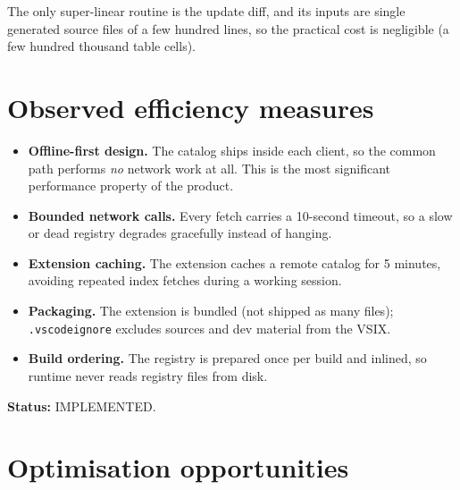 The only super-linear routine is the update diff, and its inputs are single
generated source files of a few hundred lines, so the practical cost is
negligible (a few hundred thousand table cells).

\section{Observed efficiency measures}

\begin{itemize}
  \item \textbf{Offline-first design.} The catalog ships inside each client, so
        the common path performs \emph{no} network work at all. This is the most
        significant performance property of the product.
  \item \textbf{Bounded network calls.} Every fetch carries a 10-second timeout,
        so a slow or dead registry degrades gracefully instead of hanging.
  \item \textbf{Extension caching.} The extension caches a remote catalog for
        5 minutes, avoiding repeated index fetches during a working session.
  \item \textbf{Packaging.} The extension is bundled (not shipped as many files);
        \texttt{.vscodeignore} excludes sources and dev material from the VSIX.
  \item \textbf{Build ordering.} The registry is prepared once per build and
        inlined, so runtime never reads registry files from disk.
\end{itemize}

\textbf{Status:} IMPLEMENTED.

\section{Optimisation opportunities}


